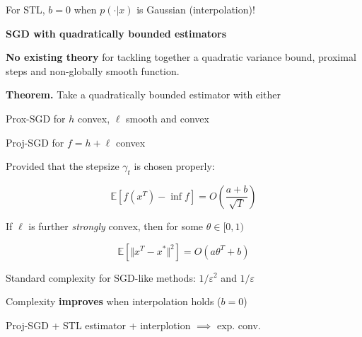 \documentclass[final]{beamer}
\newcommand{\vsp}{\vspace{15pt}} %
\begin{document}
\begin{frame}{}
\begin{columns}[t]
\begin{column}{0.30\linewidth}
\begin{colorblock}[backgroundcolor=green_dark]
\vsp

 For STL, $b=0$ when $p(\cdot | x)$ is Gaussian (interpolation)!

\vsp

\end{colorblock}		
			
		
\begin{colorblock}[backgroundcolor=green_dark]

\textbf{\large SGD with quadratically bounded estimators }

\begin{colorframe}[backgroundcolor=green_clear, linecolor=blue_fat]

{\color{blue_fat}\textbf{No existing theory}} for tackling together a quadratic variance bound, proximal steps and non-globally smooth function.
\end{colorframe}


\textbf{Theorem.}
Take a quadratically bounded estimator with either

\vsp

{\color{blue_fat}\textbf{}} Prox-SGD for $h$ convex, $\ell$ smooth and convex

{\color{blue_fat}\textbf{}} Proj-SGD for $f=h+\ell$ convex 

\vsp

Provided that the stepsize $\gamma_t$ is chosen properly:

\begin{equation*}
    \mathbb{E}\left[ f(x^T) - \inf f \right] 
    = O \left( \frac{a+b}{\sqrt{T}} \right)
\end{equation*}

\vsp

If $\ell$ is further \emph{strongly} convex, then for some $\theta \in [0,1)$

\begin{equation*}
    \mathbb{E}[\Vert x^T - x^* \Vert^2] = 
    O\left(a \theta^T +b \right)
\end{equation*}

\vsp \vsp

Standard complexity for SGD-like methods: $1/\varepsilon^2$ and $1/\varepsilon$


Complexity {\color{blue_fat}\textbf{improves}} when interpolation holds ($b=0$)

Proj-SGD + STL estimator + interplotion $\implies $ exp. conv.

\vsp
\end{colorblock}

		\end{column}%
	\end{columns}
\end{frame}
\end{document}
